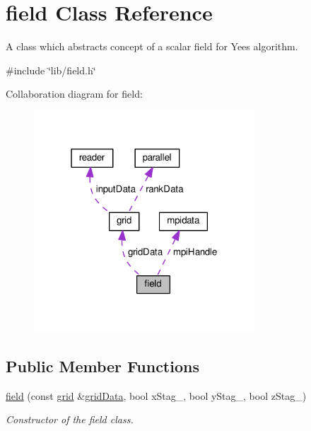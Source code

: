 \hypertarget{classfield}{}\section{field Class Reference}
\label{classfield}


A class which abstracts concept of a scalar field for Yee\textquotesingle{}s algorithm.  




{\ttfamily \#include \char`\"{}lib/field.\+h\char`\"{}}



Collaboration diagram for field\+:\nopagebreak
\begin{figure}[H]
\begin{center}
\leavevmode
\includegraphics[width=235pt]{classfield__coll__graph}
\end{center}
\end{figure}
\subsection*{Public Member Functions}
\begin{DoxyCompactItemize}
\item 
\hyperlink{classfield_a1bcb8dac73d53d1fe2dc63a5d5372d48}{field} (const \hyperlink{classgrid}{grid} \&\hyperlink{classfield_a99eb1330d0129bf1e85ca4b26feff704}{grid\+Data}, bool x\+Stag\+\_\+, bool y\+Stag\+\_\+, bool z\+Stag\+\_\+)
\begin{DoxyCompactList}\small\item\em Constructor of the field class. \end{DoxyCompactList}\end{DoxyCompactItemize}
